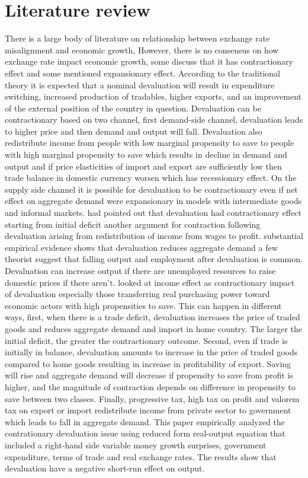 \documentclass{article}
\begin{document}
\section{ Literature review}
There is a large body of literature on relationship between exchange rate misalignment and economic growth, However, there is no consensus on how exchange rate impact economic growth, some discuss that it has contractionary effect and some mentioned expansionary effect. According to the traditional theory it is expected that a nominal devaluation will result in expenditure switching, increased production of tradables, higher exports, and an improvement of the external position of the country in question. Devaluation can be contractionary based on two channel, first demand-side channel, devaluation leads to higher price and then demand and output will fall. Devaluation also redistribute income from people with low marginal propensity to save to people with high marginal propensity to save which results in decline in demand and output and if price elasticities of import and export are sufficiently low then trade balance in domestic currency worsen which has recessionary effect. On the supply side channel it is possible for devaluation to be contractionary even if net effect on aggregate demand were expansionary in models with intermediate goods and informal markets. \cite{freund2008export} had pointed out that devaluation had contractionary effect starting from initial deficit \cite{alejandro1963note}  another argument for contraction following devaluation arising from redistribution of income from wages to profit. substantial empirical evidence shows that devaluation reduces aggregate demand a few theorist suggest that falling output and employment after devaluation is common. Devaluation can increase output if there are unemployed resources to raise domestic prices if there aren’t. \cite{krugman1976contractionary} looked at income effect as contractionary impact of devaluation especially those transferring real purchasing power toward economic actors with high propensities to save. This can happen in different ways, first, when there is a trade deficit, devaluation increases the price of traded goods and reduces aggregate demand and import in home country. The larger the initial deficit, the greater the contractionary outcome. Second, even if trade is initially in balance, devaluation amounts to increase in the price of traded goods compared to home goods resulting in increase in profitability of export. Saving will rise and aggregate demand will decrease if propensity to save from profit is higher, and the magnitude of contraction depends on difference in propensity to save between two classes. Finally, progressive tax, high tax on profit and valorem tax on export or import redistribute income from private sector to government which leads to fall in aggregate demand. \cite{edwards1985devaluations} This paper empirically analyzed the contrationary devaluation issue using reduced form real-output equation that included a right-hand side variable money growth surprises, government expenditure, terms of trade and real exchange rates. The results show that devaluation have a negative short-run effect on output.
\end{document}
